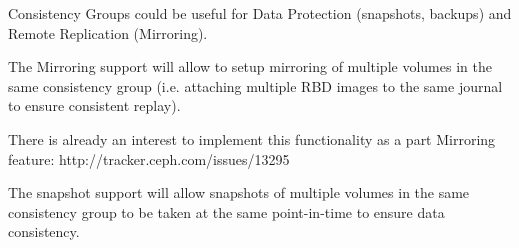 \begin{shadequote}
Consistency Groups could be useful for Data Protection (snapshots, backups) and
Remote Replication (Mirroring).

The Mirroring support will allow to setup mirroring of multiple volumes in the
same consistency group (i.e. attaching multiple RBD images to the same journal
to ensure consistent replay).

There is already an interest to implement this functionality as a part Mirroring feature:
http://tracker.ceph.com/issues/13295

The snapshot support will allow snapshots of multiple volumes in the same
consistency group to be taken at the same point-in-time to ensure data
consistency.
\end{shadequote}
